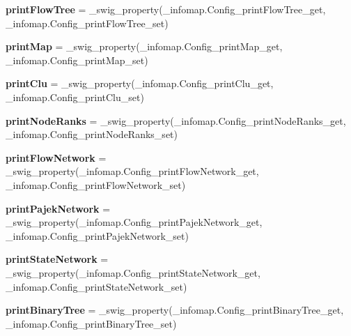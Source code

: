 \begin{DoxyCompactItemize}
{\bfseries print\+Flow\+Tree} = \+\_\+swig\+\_\+property(\+\_\+infomap.\+Config\+\_\+print\+Flow\+Tree\+\_\+get, \+\_\+infomap.\+Config\+\_\+print\+Flow\+Tree\+\_\+set)
\item 
\mbox{\label{classinfomap_1_1Config_aaa9d27bc7f40c627553c9203cb24ba2a}} 
{\bfseries print\+Map} = \+\_\+swig\+\_\+property(\+\_\+infomap.\+Config\+\_\+print\+Map\+\_\+get, \+\_\+infomap.\+Config\+\_\+print\+Map\+\_\+set)
\item 
\mbox{\label{classinfomap_1_1Config_a2044913c44c65192408ae2fd00229e8f}} 
{\bfseries print\+Clu} = \+\_\+swig\+\_\+property(\+\_\+infomap.\+Config\+\_\+print\+Clu\+\_\+get, \+\_\+infomap.\+Config\+\_\+print\+Clu\+\_\+set)
\item 
\mbox{\label{classinfomap_1_1Config_aa9306da69f62db897ffa44a1ca25a6a0}} 
{\bfseries print\+Node\+Ranks} = \+\_\+swig\+\_\+property(\+\_\+infomap.\+Config\+\_\+print\+Node\+Ranks\+\_\+get, \+\_\+infomap.\+Config\+\_\+print\+Node\+Ranks\+\_\+set)
\item 
\mbox{\label{classinfomap_1_1Config_a47db796db39c028ed0d2236d382d8757}} 
{\bfseries print\+Flow\+Network} = \+\_\+swig\+\_\+property(\+\_\+infomap.\+Config\+\_\+print\+Flow\+Network\+\_\+get, \+\_\+infomap.\+Config\+\_\+print\+Flow\+Network\+\_\+set)
\item 
\mbox{\label{classinfomap_1_1Config_aa4de02e8c55faf7fb5caa48099d50744}} 
{\bfseries print\+Pajek\+Network} = \+\_\+swig\+\_\+property(\+\_\+infomap.\+Config\+\_\+print\+Pajek\+Network\+\_\+get, \+\_\+infomap.\+Config\+\_\+print\+Pajek\+Network\+\_\+set)
\item 
\mbox{\label{classinfomap_1_1Config_a27b14ebd678cf3e2cd6a323f9c021178}} 
{\bfseries print\+State\+Network} = \+\_\+swig\+\_\+property(\+\_\+infomap.\+Config\+\_\+print\+State\+Network\+\_\+get, \+\_\+infomap.\+Config\+\_\+print\+State\+Network\+\_\+set)
\item 
\mbox{\label{classinfomap_1_1Config_a87cb8f4e6276b62ea0e5dcdb415ea7cb}} 
{\bfseries print\+Binary\+Tree} = \+\_\+swig\+\_\+property(\+\_\+infomap.\+Config\+\_\+print\+Binary\+Tree\+\_\+get, \+\_\+infomap.\+Config\+\_\+print\+Binary\+Tree\+\_\+set)

\end{DoxyCompactItemize}

